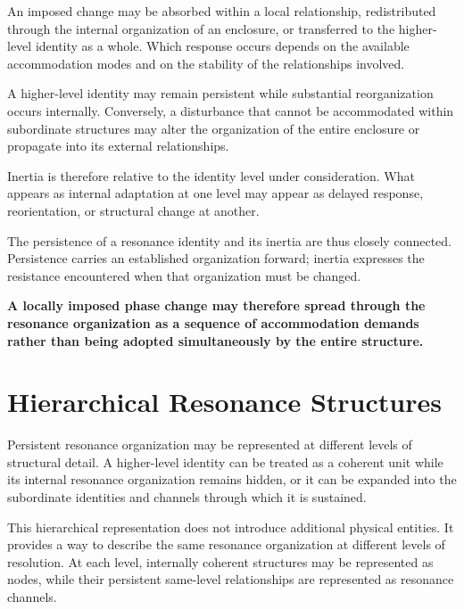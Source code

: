 \documentclass[11pt,a4paper]{article}
\begin{document}
An imposed change may be absorbed within a local relationship, redistributed through the internal organization of an enclosure, or transferred to the higher-level identity as a whole. Which response occurs depends on the available accommodation modes and on the stability of the relationships involved.

A higher-level identity may remain persistent while substantial reorganization occurs internally. Conversely, a disturbance that cannot be accommodated within subordinate structures may alter the organization of the entire enclosure or propagate into its external relationships.

Inertia is therefore relative to the identity level under consideration. What appears as internal adaptation at one level may appear as delayed response, reorientation, or structural change at another.

The persistence of a resonance identity and its inertia are thus closely connected. Persistence carries an established organization forward; inertia expresses the resistance encountered when that organization must be changed.

\textbf{A locally imposed phase change may therefore spread through the resonance organization as a sequence of accommodation demands rather than being adopted simultaneously by the entire structure.}




\section{Hierarchical Resonance Structures}

Persistent resonance organization may be represented at different levels of structural detail. A higher-level identity can be treated as a coherent unit while its internal resonance organization remains hidden, or it can be expanded into the subordinate identities and channels through which it is sustained.

This hierarchical representation does not introduce additional physical entities. It provides a way to describe the same resonance organization at different levels of resolution. At each level, internally coherent structures may be represented as nodes, while their persistent same-level relationships are represented as resonance channels.
\end{document}
